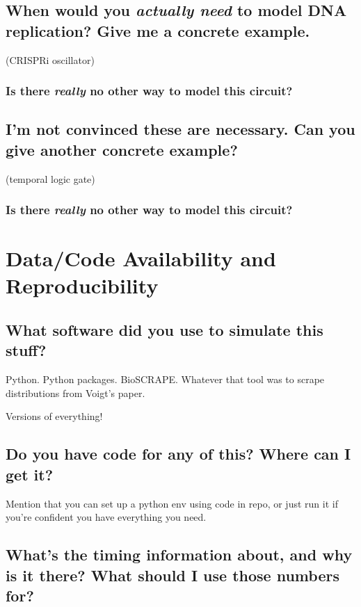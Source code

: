 \documentclass[preprint,12pt]{elsarticle}
\begin{document}
\subsection{When would you \emph{actually need} to model DNA replication? Give me a concrete example.}

	(CRISPRi oscillator)

\subsubsection{Is there \emph{really} no other way to model this circuit?}

\subsection{I'm not convinced these are necessary. Can you give another concrete example?}

	(temporal logic gate)
	
\subsubsection{Is there \emph{really} no other way to model this circuit?}

\section{Data/Code Availability and Reproducibility}

\subsection{What software did you use to simulate this stuff?}

Python. Python packages. BioSCRAPE. Whatever that tool was to scrape distributions from Voigt's paper.

Versions of everything! 

\subsection{Do you have code for any of this? Where can I get it?}

Mention that you can set up a python env using code in repo, or just run it if you're confident you have everything you need.

\subsection{What's the timing information about, and why is it there? What should I use those numbers for?}
\end{document}
